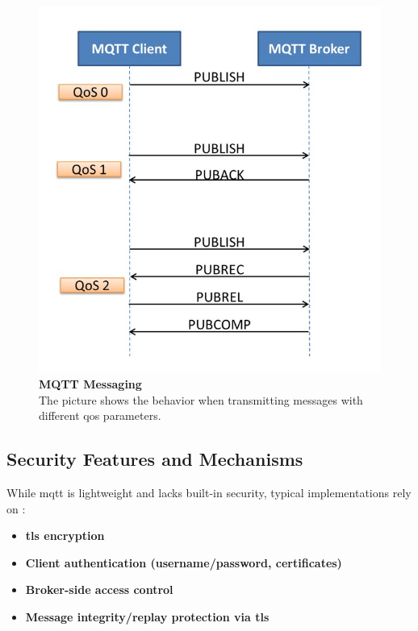\documentclass[12pt, english, openany]{book}
\begin{document}
\begin{figure}[htbp]
    \centering
    \includegraphics[width=1\textwidth]{MQTT_QOS.jpg}
    \caption{
        \textbf{MQTT Messaging} \\
        The picture shows the behavior when transmitting messages with different \gls{qos} parameters. \parencite{MQTT}
    }
    \label{fig:MQTT_QOS}
\end{figure}

\subsection{Security Features and Mechanisms}

While \gls{mqtt} is lightweight and lacks built-in security, typical implementations rely on \parencite{MQTT_WIKI}:

\begin{itemize}
    \item \textbf{\gls{tls} encryption}
    \item \textbf{Client authentication (username/password, certificates)}
    \item \textbf{Broker-side access control}
    \item \textbf{Message integrity/replay protection via \gls{tls}}
\end{itemize}
\end{document}
